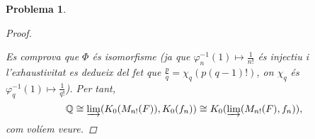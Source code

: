 \documentclass[compress]{article}
\newtheorem{problema}{Problema}
\theoremstyle{definition}
\begin{document}
\begin{problema}
\begin{enumerate}
\begin{proof}
            \begin{center}
            \end{center}
            Es comprova que $\Phi$ és isomorfisme (ja que $\varphi_{n}^{-1}(1)\mapsto\frac{1}{n!}$ és injectiu i l'exhaustivitat es dedueix del fet que $\frac{p}{q}=\chi_{q}(p(q-1)!)$, on $\chi_{q}$ és $\varphi_{q}^{-1}(1)\mapsto\frac{1}{q!}$). Per tant,
            \begin{equation*}
                \mathbb{Q}\cong \varinjlim(K_{0}(M_{n!}(F)),K_{0}(f_{n}))\cong K_{0}(\varinjlim(M_{n!}(F),f_{n})),
            \end{equation*}
            com volíem veure.
        \end{proof}
    \end{enumerate}
\end{problema}
\end{document}
